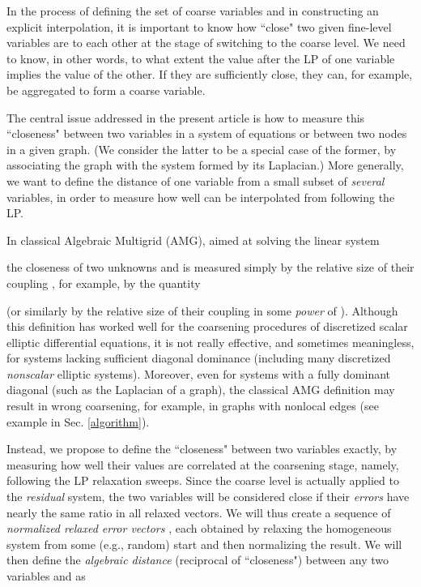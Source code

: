 \documentclass[final]{siamltex}
\begin{document}
In the process of defining the set of coarse variables and
in constructing an explicit interpolation, it is important to know
how ``close"  two given fine-level variables are to each other at
the stage of switching to the coarse level. We need to know, in other words, to what extent
the value after the LP of one variable implies the value of the other.
If they are sufficiently close, they can, for example, be
aggregated to form a coarse variable.

The central issue addressed in the present article is how to
measure this ``closeness" between two variables in a system of
equations or between two nodes in a given graph. (We consider the
latter to be a special case of the former, by associating the
graph with the system formed by its Laplacian.) More generally, we
want to define the distance of one variable  from a small subset
 of {\it several} variables, in order to measure how well 
can be interpolated from  following the LP.

In classical Algebraic Multigrid (AMG), aimed at solving the
linear system

the closeness of two unknowns  and  is measured simply
by the relative size of their coupling , for example, by the quantity

(or similarly by the relative size of their coupling in some {\it
power} of ). Although this definition has worked well for
the coarsening procedures of discretized scalar elliptic
differential equations, it is not really effective, and sometimes
meaningless, for systems lacking sufficient diagonal
dominance (including many discretized {\it nonscalar} elliptic
systems). Moreover, even for systems with a fully dominant diagonal
(such as the Laplacian of a graph), the classical AMG definition
may result in wrong coarsening, for example, in graphs
with nonlocal edges (see example in Sec. \ref{algorithm}).

Instead, we propose to define the ``closeness" between two
variables exactly, by measuring how well their values are
correlated at the coarsening stage, namely, following the LP
relaxation sweeps. Since the coarse level is actually applied to
the {\it residual} system, the two variables will be considered
close if their {\it errors} have nearly the same ratio in all
relaxed vectors. We will thus create a sequence of  {\it
normalized relaxed error vectors} , each
obtained by relaxing the homogeneous system  from some
(e.g., random) start and then normalizing the result. We will then
define the {\it algebraic distance} (reciprocal of ``closeness")
between any two variables  and  as
\end{document}
